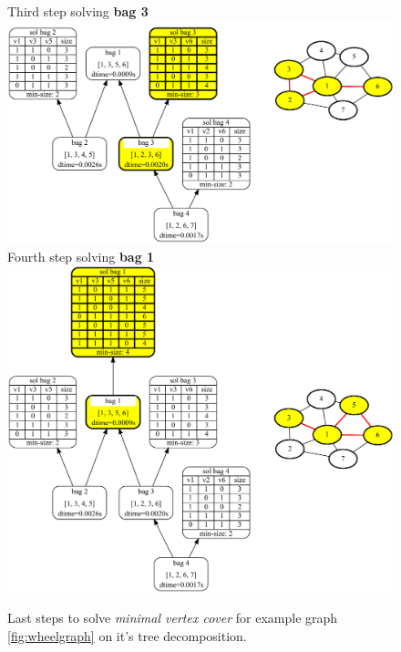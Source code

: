 \documentclass[a4paper, 12pt, bibliography=totoc]{scrartcl}
\begin{document}
\begin{figure}[H]
	\centering
	Third step solving \textbf{bag 3} \vspace{1em}\\
	
	\includegraphics[width=0.9\linewidth]{images/WheelGraph7/combined4.pdf}\\
	\vspace{0.5em}
	Fourth step solving \textbf{bag 1}\\
	
	\vspace{0.6em}
	\includegraphics[width=0.9\linewidth]{images/WheelGraph7/combined5.pdf}\\
	
	\caption{Last steps to solve \textit{minimal vertex cover} for example graph \ref{fig:wheelgraph} on it's tree decomposition.}
	\label{fig:wheelgraphc45}
\end{figure}
\end{document}
